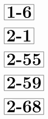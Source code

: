 \documentclass[a4paper, 10pt]{article}
\begin{document}
\begin{minipage}[t]{0.15\textwidth}
                \vspace*{-1.59cm}
        \hspace*{1.25cm}
        $\boxed{\textbf{\Huge1-6}}$
\end{minipage}
\begin{minipage}[t]{0.85\textwidth}
    
\end{minipage}

\begin{minipage}[t]{0.15\textwidth}
                \vspace*{-1.59cm}
        \hspace*{1.25cm}
        $\boxed{\textbf{\Huge2-1}}$
\end{minipage}
\begin{minipage}[t]{0.85\textwidth}
    
\end{minipage}

\begin{minipage}[t]{0.15\textwidth}
                \vspace*{-1.59cm}
        \hspace*{0.75cm}
        $\boxed{\textbf{\Huge2-55}}$
\end{minipage}
\begin{minipage}[t]{0.85\textwidth}
    
\end{minipage}

\begin{minipage}[t]{0.15\textwidth}
                \vspace*{-1.59cm}
        \hspace*{0.75cm}
        $\boxed{\textbf{\Huge2-59}}$
\end{minipage}
\begin{minipage}[t]{0.85\textwidth}
    
\end{minipage}

\begin{minipage}[t]{0.15\textwidth}
                \vspace*{-1.59cm}
        \hspace*{0.75cm}
        $\boxed{\textbf{\Huge2-68}}$
\end{minipage}
\begin{minipage}[t]{0.85\textwidth}
    
\end{minipage}
\end{document}
